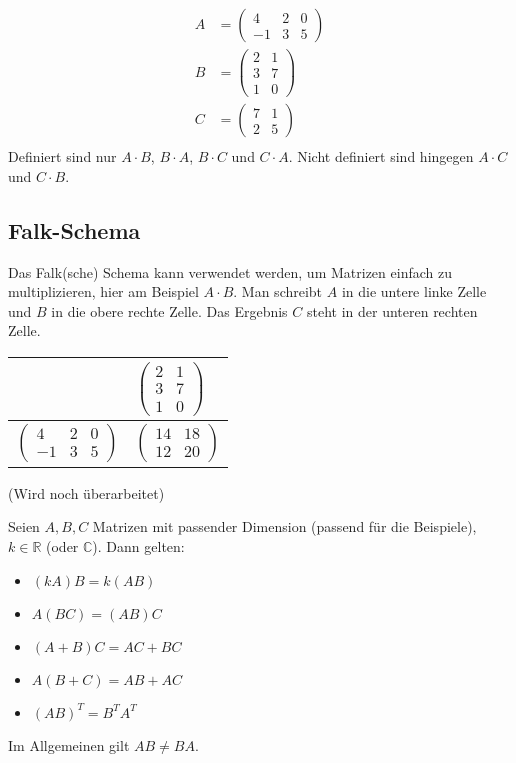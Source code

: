 \begin{align*}
    A &= \begin{pmatrix}
        4 & 2 & 0 \\
        -1 & 3 & 5
    \end{pmatrix} \\
    B &= \begin{pmatrix}
        2 & 1 \\
        3 & 7 \\
        1 & 0
    \end{pmatrix} \\
    C &= \begin{pmatrix}
        7 & 1 \\
        2 & 5
    \end{pmatrix} \\
\end{align*}
Definiert sind nur $A\cdot B$, $B\cdot A$, $B\cdot C$ und $C\cdot A$. Nicht definiert sind hingegen $A\cdot C$ und $C\cdot B$.

\subsection{Falk-Schema}
Das Falk(sche) Schema kann verwendet werden, um Matrizen einfach zu multiplizieren, hier am Beispiel $A\cdot B$. Man schreibt $A$ in die untere linke Zelle und $B$ in die obere rechte Zelle. Das Ergebnis $C$ steht in der unteren rechten Zelle.
\begin{center}
\begin{tabular}{r|l}
    & $\begin{pmatrix}2 & 1\\3 & 7\\1 & 0\end{pmatrix}$ \\ \hline
    $\begin{pmatrix}4 & 2 & 0\\-1 & 3 & 5\end{pmatrix}$ & $\begin{pmatrix} 14 & 18 \\ 12 & 20 \end{pmatrix}$
\end{tabular}
\end{center}
(Wird noch überarbeitet)

Seien $A, B, C$ Matrizen mit passender Dimension (passend für die Beispiele), $k \in \mathbb{R}$ (oder $\mathbb{C}$). Dann gelten:
\begin{itemize}
    \item{$(kA)B = k(AB)$}
    \item{$A(BC) = (AB)C$}
    \item{$(A+B)C = AC+BC$}
    \item{$A(B+C) = AB+AC$}
    \item{$(AB)^T = B^TA^T$}
\end{itemize}
Im Allgemeinen gilt $AB \neq BA$.

